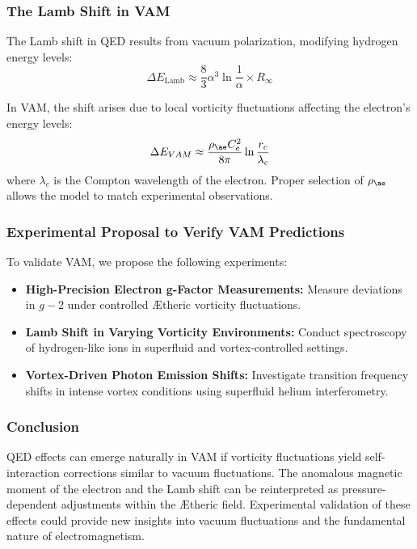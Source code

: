 \subsubsection*{The Lamb Shift in VAM}
The Lamb shift in QED results from vacuum polarization, modifying hydrogen energy levels:
\begin{equation*}
    \Delta E_{\text{Lamb}} \approx \frac{8}{3} \alpha^3 \ln \frac{1}{\alpha} \times R_{\infty}
\end{equation*}

In VAM, the shift arises due to local vorticity fluctuations affecting the electron's energy levels:
\begin{equation*}
    \Delta E_{VAM} \approx \frac{\rho_{\ae} C_e^2}{8\pi} \ln \frac{r_c}{\lambda_c}
\end{equation*}
where $\lambda_c$ is the Compton wavelength of the electron. Proper selection of $\rho_{\ae}$ allows the model to match experimental observations.

\subsubsection*{Experimental Proposal to Verify VAM Predictions}
To validate VAM, we propose the following experiments:
\begin{itemize}
    \item \textbf{High-Precision Electron g-Factor Measurements:} Measure deviations in $g-2$ under controlled Ætheric vorticity fluctuations.
    \item \textbf{Lamb Shift in Varying Vorticity Environments:} Conduct spectroscopy of hydrogen-like ions in superfluid and vortex-controlled settings.
    \item \textbf{Vortex-Driven Photon Emission Shifts:} Investigate transition frequency shifts in intense vortex conditions using superfluid helium interferometry.
\end{itemize}

\subsubsection*{Conclusion}
QED effects can emerge naturally in VAM if vorticity fluctuations yield self-interaction corrections similar to vacuum fluctuations. The anomalous magnetic moment of the electron and the Lamb shift can be reinterpreted as pressure-dependent adjustments within the Ætheric field. Experimental validation of these effects could provide new insights into vacuum fluctuations and the fundamental nature of electromagnetism.



